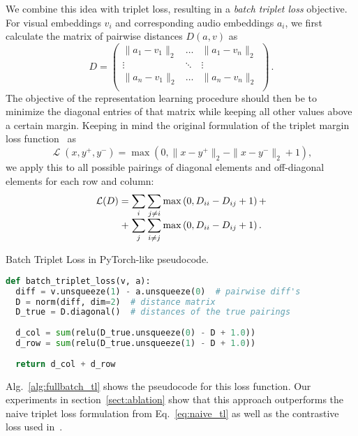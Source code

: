 \documentclass[journal]{IEEEtran}
\begin{document}
We combine this idea with triplet loss,
resulting in a \emph{batch triplet loss} objective.
For visual embeddings $v_i$ and corresponding audio embeddings $a_i$,
we first calculate the matrix of pairwise distances $D(a, v)$ as
\begin{equation}
    D = \begin{pmatrix}
        \|a_1 - v_1\|_2 & \dots & \|a_1 - v_n\|_2 \\
        \vdots & \ddots & \vdots \\
        \|a_n - v_1\|_2 & \dots & \|a_n - v_n\|_2 \\
    \end{pmatrix}\,.
\end{equation}
The objective of the representation learning procedure should then
be to minimize the diagonal entries of that matrix
while keeping all other values above a certain margin.
Keeping in mind the original formulation of the triplet margin loss function~\cite{weinberger_distance_2009}
as
\begin{equation}\label{eq:naive_tl}
    \mathop{\mathcal{L}}(x, y^+, y^-) = \max{(0, \|x - y^+\|_2 - \|x - y^-\|_2 + 1)},
\end{equation}
we apply this to all possible pairings of diagonal elements and off-diagonal elements for each
row and column:
\begin{equation}\label{eq:fullbatch_tl}
    \arraycolsep=1.4pt
    \begin{array}{rl}
    \displaystyle
    \mathcal{L}(D) =&
    \displaystyle
    \sum_i\sum_{j \neq i} \max{(0, D_{ii} - D_{ij} + 1)}\,+\\
    +&\displaystyle
    \sum_j\sum_{i \neq j} \max{(0, D_{ii} - D_{ij} + 1)}\,.
    \end{array}
\end{equation}

\begin{algorithm}[t]
\caption{Batch Triplet Loss in PyTorch-like pseudocode.}
\label{alg:fullbatch_tl}
\begin{lstlisting}[language=python]
def batch_triplet_loss(v, a):
  diff = v.unsqueeze(1) - a.unsqueeze(0)  # pairwise diff's
  D = norm(diff, dim=2)  # distance matrix
  D_true = D.diagonal()  # distances of the true pairings
  
  d_col = sum(relu(D_true.unsqueeze(0) - D + 1.0))
  d_row = sum(relu(D_true.unsqueeze(1) - D + 1.0))
  
  return d_col + d_row
\end{lstlisting}
\end{algorithm}
%
 Alg.~\ref{alg:fullbatch_tl} shows the pseudocode for this loss function.
Our experiments in section~\ref{sect:ablation} show that this approach outperforms the naive triplet
loss formulation from Eq.~\ref{eq:naive_tl} as well as
the contrastive loss used in~\cite{simclr}.
\end{document}
